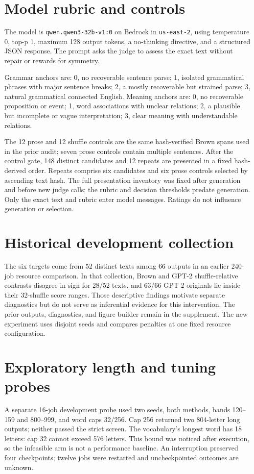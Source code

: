 \documentclass[11pt]{article}
\newcommand{\code}[1]{\texttt{#1}}
\begin{document}
\section{Model rubric and controls}\label{sec:rubric}
The model is \code{qwen.qwen3-32b-v1:0} on Bedrock in \code{us-east-2}, using temperature 0, top-p 1, maximum 128 output tokens, a no-thinking directive, and a structured JSON response. The prompt asks the judge to assess the exact text without repair or rewards for symmetry.

Grammar anchors are: 0, no recoverable sentence parse; 1, isolated grammatical phrases with major sentence breaks; 2, a mostly recoverable but strained parse; 3, natural grammatical connected English. Meaning anchors are: 0, no recoverable proposition or event; 1, word associations with unclear relations; 2, a plausible but incomplete or vague interpretation; 3, clear meaning with understandable relations.

The 12 prose and 12 shuffle controls are the same hash-verified Brown spans used in the prior audit; seven prose controls contain multiple sentences. After the control gate, 148 distinct candidates and 12 repeats are presented in a fixed hash-derived order. Repeats comprise six candidates and six prose controls selected by ascending text hash. The full presentation inventory was fixed after generation and before new judge calls; the rubric and decision thresholds predate generation. Only the exact text and rubric enter model messages. Ratings do not influence generation or selection.

\section{Historical development collection}
The six targets come from 52 distinct texts among 66 outputs in an earlier 240-job resource comparison. In that collection, Brown and GPT-2 shuffle-relative contrasts disagree in sign for 28/52 texts, and 63/66 GPT-2 originals lie inside their 32-shuffle score ranges. Those descriptive findings motivate separate diagnostics but do not serve as inferential evidence for this intervention. The prior outputs, diagnostics, and figure builder remain in the supplement. The new experiment uses disjoint seeds and compares penalties at one fixed resource configuration.

\section{Exploratory length and tuning probes}
A separate 16-job development probe used two seeds, both methods, bands 120--159 and 800--999, and word caps 32/256. Cap 256 returned two 804-letter long outputs; neither passed the strict screen. The vocabulary's longest word has 18 letters: cap 32 cannot exceed 576 letters. This bound was noticed after execution, so the infeasible arm is not a performance baseline. An interruption preserved four checkpoints; twelve jobs were restarted and uncheckpointed outcomes are unknown.
\end{document}
